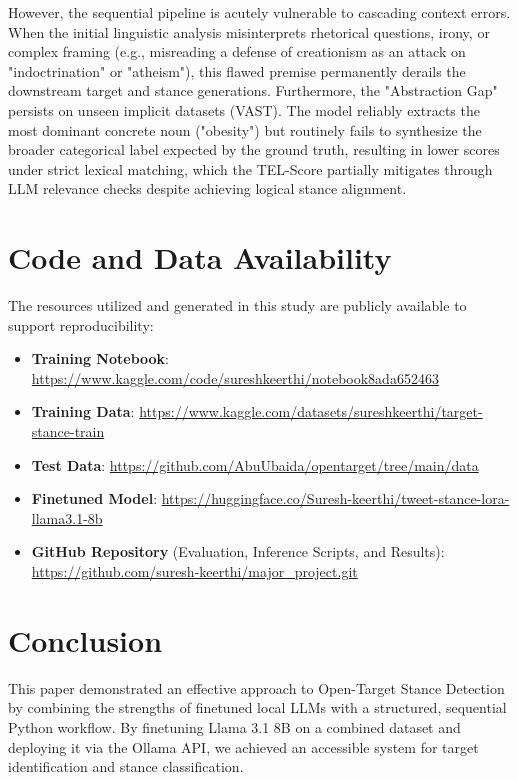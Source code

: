 \documentclass[conference]{IEEEtran}
\begin{document}
However, the sequential pipeline is acutely vulnerable to cascading context errors. When the initial linguistic analysis misinterprets rhetorical questions, irony, or complex framing (e.g., misreading a defense of creationism as an attack on "indoctrination" or "atheism"), this flawed premise permanently derails the downstream target and stance generations. Furthermore, the "Abstraction Gap" persists on unseen implicit datasets (VAST). The model reliably extracts the most dominant concrete noun ("obesity") but routinely fails to synthesize the broader categorical label expected by the ground truth, resulting in lower scores under strict lexical matching, which the TEL-Score partially mitigates through LLM relevance checks despite achieving logical stance alignment.


\section{Code and Data Availability}

The resources utilized and generated in this study are publicly available to support reproducibility:

\begin{itemize}
    \item \textbf{Training Notebook}: \url{https://www.kaggle.com/code/sureshkeerthi/notebook8ada652463}
    \item \textbf{Training Data}: \url{https://www.kaggle.com/datasets/sureshkeerthi/target-stance-train}
    \item \textbf{Test Data}: \url{https://github.com/AbuUbaida/opentarget/tree/main/data}
    \item \textbf{Finetuned Model}: \url{https://huggingface.co/Suresh-keerthi/tweet-stance-lora-llama3.1-8b}
    \item \textbf{GitHub Repository} (Evaluation, Inference Scripts, and Results): \url{https://github.com/suresh-keerthi/major_project.git}
\end{itemize}

\section{Conclusion}

This paper demonstrated an effective approach to Open-Target Stance Detection by combining the strengths of finetuned local LLMs with a structured, sequential Python workflow. By finetuning Llama 3.1 8B on a combined dataset and deploying it via the Ollama API, we achieved an accessible system for target identification and stance classification.
\end{document}
